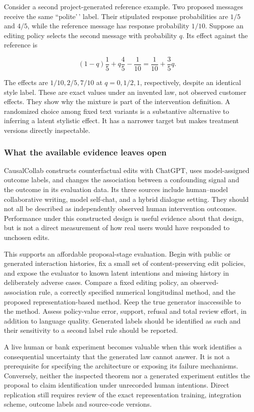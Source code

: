 Consider a second project-generated reference example. Two proposed
messages receive the same ``polite'\,' label. Their stipulated response
probabilities are \(1/5\) and \(4/5\), while the reference message has
response probability \(1/10\). Suppose an editing policy selects the
second message with probability \(q\). Its effect against the reference
is

\[
 (1-q)\frac15+q\frac45-\frac1{10}
 =\frac1{10}+\frac35q.
\]

The effects are \(1/10,2/5,7/10\) at \(q=0,1/2,1\), respectively,
despite an identical style label. These are exact values under an
invented law, not observed customer effects. They show why the mixture
is part of the intervention definition. A randomized choice among fixed
text variants is a substantive alternative to inferring a latent
stylistic effect. It has a narrower target but makes treatment versions
directly inspectable.

\hypertarget{what-the-available-evidence-leaves-open}{%
\subsubsection{What the available evidence leaves
open}\label{what-the-available-evidence-leaves-open}}

CausalCollab constructs counterfactual edits with ChatGPT, uses
model-assigned outcome labels, and changes the association between a
confounding signal and the outcome in its evaluation data. Its three
sources include human--model collaborative writing, model self-chat, and
a hybrid dialogue setting. They should not all be described as
independently observed human intervention outcomes. Performance under
this constructed design is useful evidence about that design, but is not
a direct measurement of how real users would have responded to unchosen
edits. \cite{exec13_census_collaboration}

This supports an affordable proposal-stage evaluation. Begin with public
or generated interaction histories, fix a small set of
content-preserving edit policies, and expose the evaluator to known
latent intentions and missing history in deliberately adverse cases.
Compare a fixed editing policy, an observed-association rule, a
correctly specified numerical longitudinal method, and the proposed
representation-based method. Keep the true generator inaccessible to the
method. Assess policy-value error, support, refusal and total review
effort, in addition to language quality. Generated labels should be
identified as such and their sensitivity to a second label rule should
be reported.

A live human or bank experiment becomes valuable when this work
identifies a consequential uncertainty that the generated law cannot
answer. It is not a prerequisite for specifying the architecture or
exposing its failure mechanisms. Conversely, neither the inspected
theorem nor a generated experiment entitles the proposal to claim
identification under unrecorded human intentions. Direct replication
still requires review of the exact representation training, integration
scheme, outcome labels and source-code versions.

\label{exec13:census-temporal-end}

